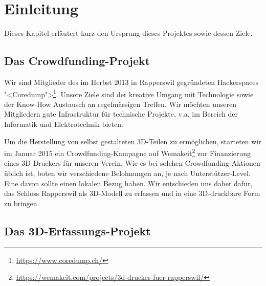\chapter{Einleitung}

\label{ch:einleitung}


Dieses Kapitel erläutert kurz den Ursprung dieses Projektes sowie dessen Ziele.


\section{Das Crowdfunding-Projekt}\label{sec:crowdfunding}

Wir sind Mitglieder des im Herbst 2013 in Rapperswil gegründeten Hackerspaces
"<Coredump">\footnote{\url{https://www.coredump.ch/}}. Unsere Ziele sind der
kreative Umgang mit Technologie sowie der Know-How Austausch an regelmässigen
Treffen. Wir möchten unseren Mitgliedern gute Infrastruktur für technische
Projekte, v.a. im Bereich der Informatik und Elektrotechnik bieten.


Um die Herstellung von selbst gestalteten 3D-Teilen zu ermöglichen, starteten
wir im Januar 2015 ein Crowdfunding-Kampagne auf
Wemakeit\footnote{\url{https://wemakeit.com/projects/3d-drucker-fuer-rapperswil/}}
zur Finanzierung eines 3D-Druckers für unseren Verein. Wie es bei solchen
Crowdfunding-Aktionen üblich ist, boten wir verschiedene Belohnungen an, je nach
Unterstützer-Level. Eine davon sollte einen lokalen Bezug haben. Wir entschieden
uns daher dafür, das Schloss Rapperswil als 3D-Modell zu erfassen und in eine
3D-druckbare Form zu bringen.


\section{Das 3D-Erfassungs-Projekt}\label{sec:3d-project}


